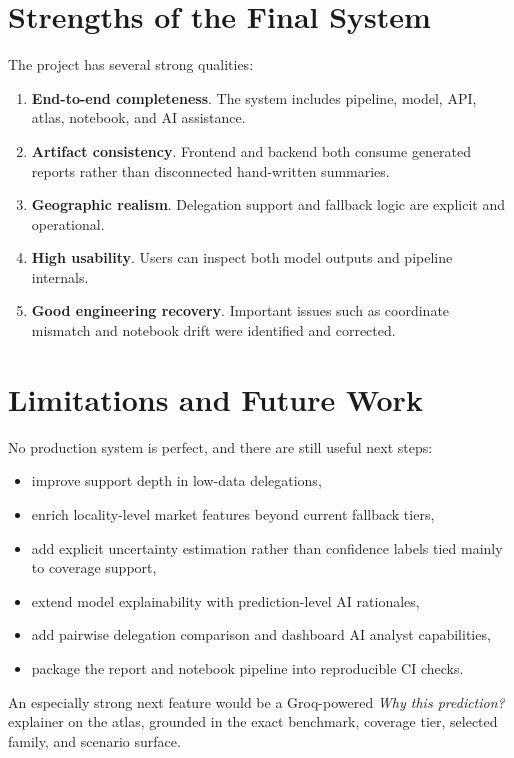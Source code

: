 \documentclass[11pt,a4paper]{article}
\newcommand{\highlight}[1]{\textcolor{BrandRedDark}{\textbf{#1}}}
\begin{document}
\section{Strengths of the Final System}

The project has several strong qualities:

\begin{enumerate}
\item \highlight{End-to-end completeness}. The system includes pipeline, model, API, atlas, notebook, and AI assistance.
\item \highlight{Artifact consistency}. Frontend and backend both consume generated reports rather than disconnected hand-written summaries.
\item \highlight{Geographic realism}. Delegation support and fallback logic are explicit and operational.
\item \highlight{High usability}. Users can inspect both model outputs and pipeline internals.
\item \highlight{Good engineering recovery}. Important issues such as coordinate mismatch and notebook drift were identified and corrected.
\end{enumerate}

\section{Limitations and Future Work}

No production system is perfect, and there are still useful next steps:

\begin{itemize}
\item improve support depth in low-data delegations,
\item enrich locality-level market features beyond current fallback tiers,
\item add explicit uncertainty estimation rather than confidence labels tied mainly to coverage support,
\item extend model explainability with prediction-level AI rationales,
\item add pairwise delegation comparison and dashboard AI analyst capabilities,
\item package the report and notebook pipeline into reproducible CI checks.
\end{itemize}

An especially strong next feature would be a Groq-powered \emph{Why this prediction?} explainer on the atlas, grounded in the exact benchmark, coverage tier, selected family, and scenario surface.
\end{document}
